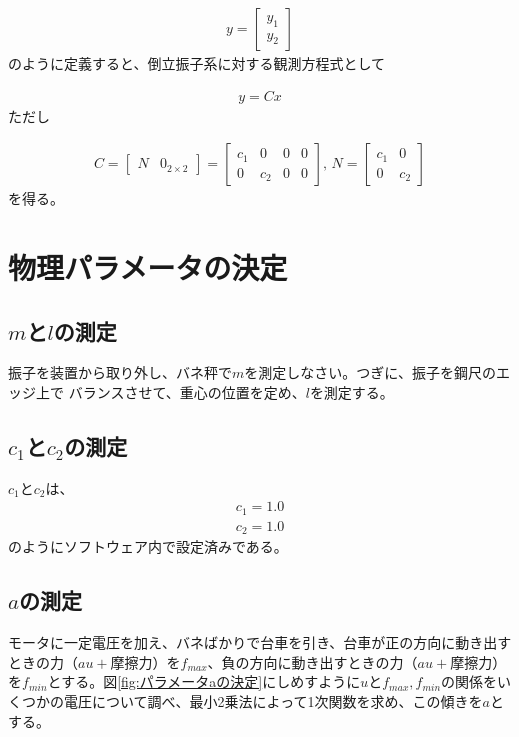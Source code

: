 \documentclass[a4j,11pt,twoside]{jbook}
\begin{document}
\begin{eqnarray}
	y = \left[
	\begin{array}{c}
		y_1\\
		y_2
	\end{array}
	\right]
\end{eqnarray}
のように定義すると、倒立振子系に対する観測方程式として

\begin{eqnarray}
	y = Cx
\end{eqnarray}
ただし

\begin{eqnarray}
C = \left[
\begin{array}{cc}
N & 0_{2×2}
\end{array}
\right] = \left[
\begin{array}{cccc}
c_1 &  0  & 0 & 0\\
0  & c_2 & 0 & 0
\end{array}
\right],\,
N = \left[
\begin{array}{cc}
c_1 &  0 \\
0  & c_2
\end{array}
\right]
\label{eq:C,N}
\end{eqnarray}
を得る。

\section{物理パラメータの決定}
\subsection{$m$と$l$の測定}
振子を装置から取り外し、バネ秤で$m$を測定しなさい。つぎに、振子を鋼尺のエッジ上で
バランスさせて、重心の位置を定め、$l$を測定する。

\subsection{$c_1$と$c_2$の測定}
$c_1$と$c_2$は、
\begin{eqnarray}
	c_1 = 1.0\\
	c_2 = 1.0
\end{eqnarray}
のようにソフトウェア内で設定済みである。

\subsection{$a$の測定}
モータに一定電圧を加え、バネばかりで台車を引き、台車が正の方向に動き出すときの力（$au+摩擦力$）を$f_{max}$、負の方向に動き出すときの力（$au+摩擦力$）を$f_{min}$とする。図\ref{fig:パラメータaの決定}にしめすように$u$と$f_{max},f_{min}$の関係をいくつかの電圧について調べ、最小2乗法によって1次関数を求め、この傾きを$a$とする。
\end{document}
